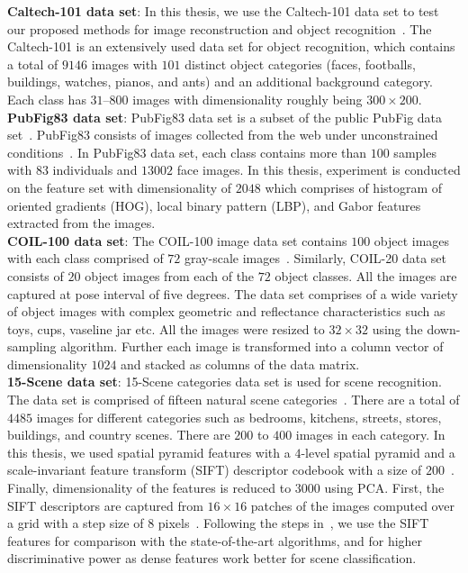 \noindent\textbf{Caltech-101 data set}: In this thesis, we use the Caltech-101 data set to test our proposed methods for image reconstruction and object recognition~\cite{Caltech101}. The Caltech-101 is an extensively used data set for object recognition, which contains a total of $9146$ images with $101$ distinct object categories (faces, footballs, buildings, watches, pianos, and ants) and an additional background category. Each class has $31$–$800$ images with dimensionality roughly being $300 \times 200$.\\
%
\noindent\textbf{PubFig83 data set}: PubFig83 data set is a subset of the public PubFig data set~\cite{PubFig83}. PubFig83 consists of images collected from the web under unconstrained conditions~\cite{PubFig83}. In PubFig83 data set, each class contains more than $100$ samples with $83$ individuals and $13002$ face images. In this thesis, experiment is conducted on the feature set with dimensionality of $2048$ which comprises of histogram of oriented gradients (HOG), local binary pattern (LBP), and Gabor features extracted from the images.\\
%
\noindent\textbf{COIL-100 data set}: The COIL-100 image data set contains $100$ object images with each class comprised of $72$ gray-scale images~\cite{Data_COIL}. Similarly, COIL-20 data set consists of $20$ object images from each of the $72$ object classes. All the images are captured at pose interval of five degrees. The data set comprises of a wide variety of object images with complex geometric and reflectance characteristics such as toys, cups, vaseline jar etc. All the images were resized to $32 \times 32$ using the down-sampling algorithm. Further each image is transformed into a column vector of dimensionality $1024$ and stacked as columns of the data matrix.\\
%
\textbf{15-Scene data set}: 15-Scene categories data set is used for scene recognition. The data set is comprised of fifteen natural scene categories~\cite{15scene_1, 15scene_2, 15scene_3}. There are a total of $4485$ images for different categories such as bedrooms, kitchens, streets, stores, buildings, and country scenes. There are $200$ to $400$ images in each category. In this thesis, we used spatial pyramid features with a $4$-level spatial pyramid and a scale-invariant feature transform (SIFT) descriptor codebook with a size of $200$~\cite{LCKSVD}. Finally, dimensionality of the features is reduced to $3000$ using PCA. First, the SIFT descriptors are captured from $16 \times 16$ patches of the images computed over a grid with a step size of $8$ pixels~\cite{15scene_3}. Following the steps in~\cite{LCKSVD, 15scene_3}, we use the SIFT features for comparison with the state-of-the-art algorithms, and for higher discriminative power as dense features work better for scene classification.
